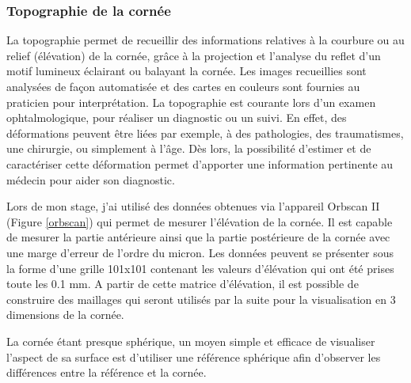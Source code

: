 \documentclass[a4paper,12pt]{article}
\begin{document}
		\subsubsection{Topographie de la cornée}
La topographie permet de recueillir des informations relatives à la courbure ou au relief (élévation) de la cornée, grâce à la projection et l'analyse du reflet d'un motif lumineux éclairant ou balayant la cornée. Les images recueillies sont analysées de façon automatisée et des cartes en couleurs sont fournies au praticien pour interprétation. La topographie est courante lors d'un examen ophtalmologique, pour réaliser un diagnostic ou un suivi. En effet, des déformations peuvent être liées par exemple, à des pathologies, des traumatismes, une chirurgie, ou simplement à l'âge. Dès lors, la possibilité d'estimer et de caractériser cette déformation permet d'apporter une information pertinente au médecin pour aider son diagnostic.\cite{gatinel, arnaud}

Lors de mon stage, j'ai utilisé des données obtenues via l'appareil Orbscan II (Figure \ref{orbscan}) qui permet de mesurer l'élévation de la cornée. Il est capable de mesurer la partie antérieure ainsi que la partie postérieure de la cornée avec une marge d'erreur de l'ordre du micron. Les données peuvent se présenter sous la forme d'une grille 101x101 contenant les valeurs d'élévation qui ont été prises toute les 0.1 mm. A partir de cette matrice d'élévation, il est possible de construire des maillages qui seront utilisés par la suite pour la visualisation en 3 dimensions de la cornée. 

La cornée étant presque sphérique, un moyen simple et efficace de visualiser l'aspect de sa surface est d'utiliser une référence sphérique afin d'observer les différences entre la référence et la cornée. 
\vspace{0.25cm}
\end{document}
